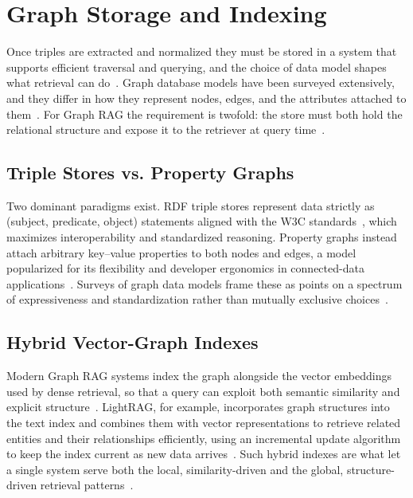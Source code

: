 \section{Graph Storage and Indexing}
\label{sec:gr-storage}

Once triples are extracted and normalized they must be stored in a system that
supports efficient traversal and querying, and the choice of data model shapes
what retrieval can do~\cite{angles2008graphdb}. Graph database models have been
surveyed extensively, and they differ in how they represent nodes, edges, and the
attributes attached to them~\cite{angles2008graphdb}. For Graph RAG the
requirement is twofold: the store must both hold the relational structure and
expose it to the retriever at query time~\cite{peng2024graphrag}.

\subsection{Triple Stores vs. Property Graphs}

Two dominant paradigms exist. RDF triple stores represent data strictly as
(subject, predicate, object) statements aligned with the W3C
standards~\cite{w3c2014rdf}, which maximizes interoperability and standardized
reasoning. Property graphs instead attach arbitrary key--value properties to both
nodes and edges, a model popularized for its flexibility and developer
ergonomics in connected-data applications~\cite{robinson2015graphdb}. Surveys of
graph data models frame these as points on a spectrum of expressiveness and
standardization rather than mutually exclusive
choices~\cite{angles2008graphdb, hogan2021kg}.

\subsection{Hybrid Vector-Graph Indexes}

Modern Graph RAG systems index the graph alongside the vector embeddings used by
dense retrieval, so that a query can exploit both semantic similarity and
explicit structure~\cite{peng2024graphrag}. LightRAG, for example, incorporates
graph structures into the text index and combines them with vector
representations to retrieve related entities and their relationships efficiently,
using an incremental update algorithm to keep the index current as new data
arrives~\cite{guo2024lightrag}. Such hybrid indexes are what let a single system
serve both the local, similarity-driven and the global, structure-driven retrieval
patterns~\cite{peng2024graphrag, guo2024lightrag}.
